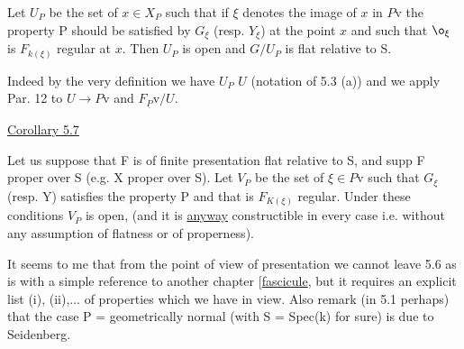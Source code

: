 
Let $U_{P}$ be the set of $x \in X_{P}$ such that if $\xi$ denotes the image of $x$
in $P\mathrm{v}$ the property P should be satisfied by $G_{\xi}$ (resp. $Y_{\xi}$) at the
point $x$ and such that $\o_{\xi}$ is $F_{k(\xi)}$ regular at $x$.  Then $U_{P}$ is open and
$G/U_{P}$ is flat relative to S.

Indeed by the very definition we have $U_{P}$ \quad $U$ (notation of 5.3
(a)) and we apply Par. 12 to $U \to P\mathrm{v}$ and $F_{\underline{P}}\mathrm{v}/U$.

\uline{Corollary 5.7}

Let us suppose that F is of finite presentation flat relative
to S, and supp F proper over S (e.g. X proper over S).  Let $V_{P}$ be
the set of $\xi \in P\mathrm{v}$ such that $G_{\xi}$ (resp. Y) satisfies the property P
and that is $F_{K(\xi)}$ regular.  Under these conditions $V_{P}$ is open, (and
it is \uline{anyway} constructible in every case i.e. without any
assumption of flatness or of properness).

It seems to me that from the point of view of presentation we
cannot leave 5.6 as is with a simple reference to another chapter
[\uline{fascicule}, but it requires an explicit list (i), (ii),... of
properties which we have in view.  Also remark (in 5.1 perhaps)
that the case P = geometrically normal (with S = Spec(k) for sure)
is due to Seidenberg.
